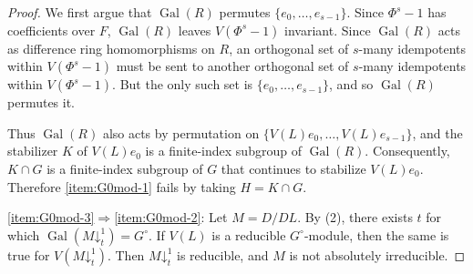 \documentclass[11pt,reqno]{amsart}
\theoremstyle{definition}
\DeclareMathOperator{\Gal}{Gal}
\newcommand{\pda}{\mathord{\downarrow}}
\newcommand{\warning}[1]{{\color{c1}#1}}
\begin{document}
\begin{proof}
    We first argue that $\Gal(R)$ permutes $\{e_0,\dots,e_{s-1}\}$.
    Since $\Phi^s-1$ has coefficients over $F$, $\Gal(R)$ leaves $V(\Phi^s-1)$ invariant.
    Since $\Gal(R)$ acts as difference ring homomorphisms on $R$, an orthogonal set of $s$-many idempotents within $V(\Phi^s-1)$ must be sent to another orthogonal set of $s$-many idempotents within $V(\Phi^s-1)$. But the only such set is $\{e_0,\dots,e_{s-1}\}$, and so $\Gal(R)$ permutes it.
    
    Thus $\Gal(R)$ also acts by permutation on $\{V(L)e_0, \dots, V(L)e_{s-1}\}$, and the stabilizer $K$ of $V(L)e_0$ is a finite-index subgroup of $\Gal(R)$. 
    Consequently, $K\cap G$ is a finite-index subgroup of $G$ that continues to stabilize $V(L)e_0$. Therefore \eqref{item:G0mod-1} fails by taking $H=K\cap G$.

    \eqref{item:G0mod-3}$\Rightarrow$\eqref{item:G0mod-2}:
    Let $M = D/DL$.
    By  (2), there exists $t$ for which $\Gal(M\pda^{1}_{t}) = G^{\circ}$.
    If $V(L)$ is a reducible $G^{\circ}$-module, then the same is true for $V(M\pda^{1}_{t})$. Then
    $M\pda^{1}_{t}$ is reducible, and $M$ is not absolutely irreducible.
\end{proof}
\end{document}
